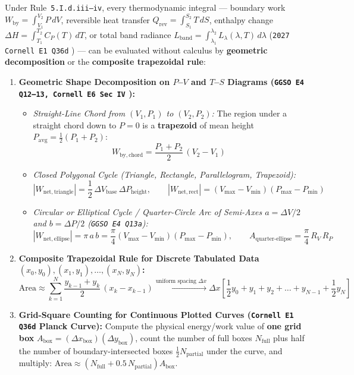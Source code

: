 Under Rule~\texttt{5.I.d.iii--iv}, every thermodynamic integral --- boundary work $W_{\mathrm{by}} = \int_{V_1}^{V_2} P\,dV$, reversible heat transfer $Q_{\mathrm{rev}} = \int_{S_1}^{S_2} T\,dS$, enthalpy change $\Delta H = \int_{T_1}^{T_2} C_P(T)\,dT$, or total band radiance $L_{\mathrm{band}} = \int_{\lambda_1}^{\lambda_2} L_\lambda(\lambda,T)\,d\lambda$ (\texttt{2027 Cornell E1 Q36d} ) --- can be evaluated without calculus by \textbf{geometric decomposition} or the \textbf{composite trapezoidal rule}:
\begin{enumerate}
  \item \textbf{Geometric Shape Decomposition on $P$--$V$ and $T$--$S$ Diagrams (\texttt{GGSO E4 Q12--13, Cornell E6 Sec IV} ):}
  \begin{itemize}
    \item \emph{Straight-Line Chord from $(V_1, P_1)$ to $(V_2, P_2)$:} The region under a straight chord down to $P=0$ is a \textbf{trapezoid} of mean height $P_{\mathrm{avg}} = \frac{1}{2}(P_1 + P_2)$:
    \begin{equation}\label{eq:18:chordwork}
      W_{\mathrm{by,chord}} = \frac{P_1 + P_2}{2}\,(V_2 - V_1)
    \end{equation}
    \item \emph{Closed Polygonal Cycle (Triangle, Rectangle, Parallelogram, Trapezoid):}
    $$\left|W_{\mathrm{net,triangle}}\right| = \frac{1}{2}\,\Delta V_{\mathrm{base}}\,\Delta P_{\mathrm{height}}, \qquad \left|W_{\mathrm{net,rect}}\right| = (V_{\max} - V_{\min})(P_{\max} - P_{\min})$$
    \item \emph{Circular or Elliptical Cycle / Quarter-Circle Arc of Semi-Axes $a = \Delta V/2$ and $b = \Delta P/2$ (\texttt{GGSO E4 Q13a}):}
    $$\left|W_{\mathrm{net,ellipse}}\right| = \pi\,a\,b = \frac{\pi}{4}(V_{\max} - V_{\min})(P_{\max} - P_{\min}), \qquad A_{\mathrm{quarter\text{-}ellipse}} = \frac{\pi}{4}\,R_V\,R_P$$
  \end{itemize}
  \item \textbf{Composite Trapezoidal Rule for Discrete Tabulated Data $(x_0, y_0), (x_1, y_1), \dots, (x_N, y_N)$:}
  \begin{equation}\label{eq:18:trap}
    \text{Area} \approx \sum_{k=1}^N \frac{y_{k-1} + y_k}{2}\,(x_k - x_{k-1}) \xrightarrow{\text{uniform spacing }\Delta x} \Delta x\left[\frac{1}{2}y_0 + y_1 + y_2 + \dots + y_{N-1} + \frac{1}{2}y_N\right]
  \end{equation}
  \item \textbf{Grid-Square Counting for Continuous Plotted Curves (\texttt{Cornell E1 Q36d} Planck Curve):}
  Compute the physical energy/work value of \textbf{one grid box} $A_{\mathrm{box}} = (\Delta x_{\mathrm{box}})(\Delta y_{\mathrm{box}})$, count the number of full boxes $N_{\mathrm{full}}$ plus half the number of boundary-intersected boxes $\frac{1}{2}N_{\mathrm{partial}}$ under the curve, and multiply: $\text{Area} \approx (N_{\mathrm{full}} + 0.5\,N_{\mathrm{partial}})A_{\mathrm{box}}$.
\end{enumerate}

